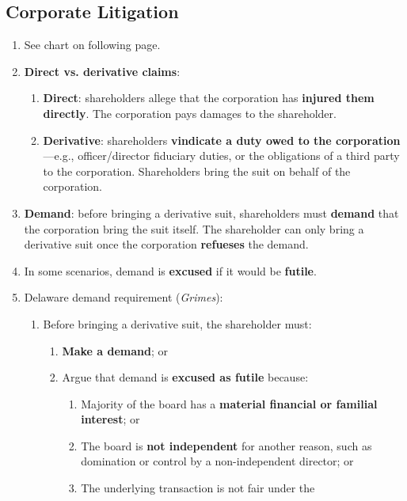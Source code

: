 \newpage

\subsection{Corporate Litigation}

\begin{enumerate}
    \item See chart on following page.
    \item \textbf{Direct vs. derivative claims}:
    \begin{enumerate}
        \item \textbf{Direct}: shareholders allege that the corporation has 
        \textbf{injured them directly}. The corporation pays damages to the 
        shareholder.
        \item \textbf{Derivative}: shareholders \textbf{vindicate a duty owed 
        to the corporation}---e.g., officer/director fiduciary duties, or the 
        obligations of a third party to the corporation. Shareholders bring 
        the suit on behalf of the corporation.
    \end{enumerate}
    \item \textbf{Demand}: before bringing a derivative suit, shareholders 
    must \textbf{demand} that the corporation bring the suit itself. The 
    shareholder can only bring a derivative suit once the corporation 
    \textbf{refueses} the demand.
    \item In some scenarios, demand is \textbf{excused} if it would be 
    \textbf{futile}.
    \item Delaware demand requirement (\emph{Grimes}):
    \begin{enumerate}
        \item Before bringing a derivative suit, the shareholder must:
        \begin{enumerate}
            \item \textbf{Make a demand}; or
            \item Argue that demand is \textbf{excused as futile} because:
            \begin{enumerate}
                \item Majority of the board has a \textbf{material financial 
                or familial interest}; or
                \item The board is \textbf{not independent} for another 
                reason, such as domination or control by a non-independent 
                director; or
                \item The underlying transaction is not fair under the 

\end{enumerate}
\end{enumerate}
\end{enumerate}
\end{enumerate}
